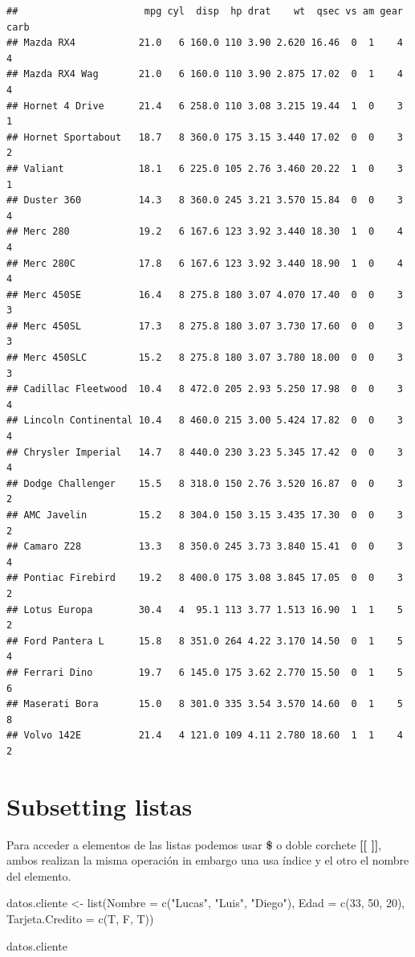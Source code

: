 \documentclass[
  12pt,
]{book}
\newenvironment{Shaded}{\begin{snugshade}}{\end{snugshade}}
\newcommand{\AttributeTok}[1]{\textcolor[rgb]{0.77,0.63,0.00}{#1}}
\newcommand{\DecValTok}[1]{\textcolor[rgb]{0.00,0.00,0.81}{#1}}
\newcommand{\FunctionTok}[1]{\textcolor[rgb]{0.00,0.00,0.00}{#1}}
\newcommand{\NormalTok}[1]{#1}
\newcommand{\OtherTok}[1]{\textcolor[rgb]{0.56,0.35,0.01}{#1}}
\newcommand{\StringTok}[1]{\textcolor[rgb]{0.31,0.60,0.02}{#1}}
\begin{document}
\begin{verbatim}
##                      mpg cyl  disp  hp drat    wt  qsec vs am gear carb
## Mazda RX4           21.0   6 160.0 110 3.90 2.620 16.46  0  1    4    4
## Mazda RX4 Wag       21.0   6 160.0 110 3.90 2.875 17.02  0  1    4    4
## Hornet 4 Drive      21.4   6 258.0 110 3.08 3.215 19.44  1  0    3    1
## Hornet Sportabout   18.7   8 360.0 175 3.15 3.440 17.02  0  0    3    2
## Valiant             18.1   6 225.0 105 2.76 3.460 20.22  1  0    3    1
## Duster 360          14.3   8 360.0 245 3.21 3.570 15.84  0  0    3    4
## Merc 280            19.2   6 167.6 123 3.92 3.440 18.30  1  0    4    4
## Merc 280C           17.8   6 167.6 123 3.92 3.440 18.90  1  0    4    4
## Merc 450SE          16.4   8 275.8 180 3.07 4.070 17.40  0  0    3    3
## Merc 450SL          17.3   8 275.8 180 3.07 3.730 17.60  0  0    3    3
## Merc 450SLC         15.2   8 275.8 180 3.07 3.780 18.00  0  0    3    3
## Cadillac Fleetwood  10.4   8 472.0 205 2.93 5.250 17.98  0  0    3    4
## Lincoln Continental 10.4   8 460.0 215 3.00 5.424 17.82  0  0    3    4
## Chrysler Imperial   14.7   8 440.0 230 3.23 5.345 17.42  0  0    3    4
## Dodge Challenger    15.5   8 318.0 150 2.76 3.520 16.87  0  0    3    2
## AMC Javelin         15.2   8 304.0 150 3.15 3.435 17.30  0  0    3    2
## Camaro Z28          13.3   8 350.0 245 3.73 3.840 15.41  0  0    3    4
## Pontiac Firebird    19.2   8 400.0 175 3.08 3.845 17.05  0  0    3    2
## Lotus Europa        30.4   4  95.1 113 3.77 1.513 16.90  1  1    5    2
## Ford Pantera L      15.8   8 351.0 264 4.22 3.170 14.50  0  1    5    4
## Ferrari Dino        19.7   6 145.0 175 3.62 2.770 15.50  0  1    5    6
## Maserati Bora       15.0   8 301.0 335 3.54 3.570 14.60  0  1    5    8
## Volvo 142E          21.4   4 121.0 109 4.11 2.780 18.60  1  1    4    2
\end{verbatim}

\hypertarget{subsetting-listas}{%
\section{\texorpdfstring{\textbf{Subsetting listas}}{Subsetting listas}}\label{subsetting-listas}}

Para acceder a elementos de las listas podemos usar \textbf{\$} o doble corchete \textbf{{[}{[} {]}{]}}, ambos realizan la misma operación in embargo una usa índice y el otro el nombre del elemento.

\begin{Shaded}
\begin{Highlighting}[]
\NormalTok{datos.cliente }\OtherTok{\textless{}{-}} \FunctionTok{list}\NormalTok{(}\AttributeTok{Nombre =} \FunctionTok{c}\NormalTok{(}\StringTok{"Lucas"}\NormalTok{, }\StringTok{"Luis"}\NormalTok{, }\StringTok{"Diego"}\NormalTok{), }\AttributeTok{Edad =} \FunctionTok{c}\NormalTok{(}\DecValTok{33}\NormalTok{, }\DecValTok{50}\NormalTok{, }\DecValTok{20}\NormalTok{), }\AttributeTok{Tarjeta.Credito =} \FunctionTok{c}\NormalTok{(T, F, T))}

\NormalTok{datos.cliente}
\end{Highlighting}
\end{Shaded}
\end{document}
